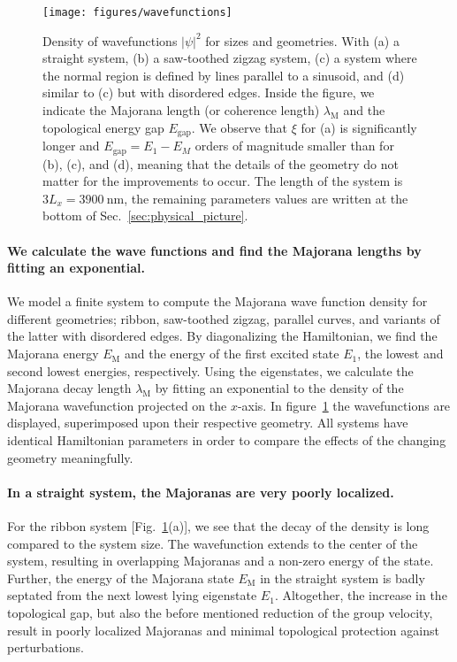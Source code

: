 \documentclass[english, twocolumn, 10pt, aps, superscriptaddress, floatfix, prb, citeautoscript]{revtex4-1}
\renewcommand{\comment}[2]{#2}
\renewcommand{\comment}{\paragraph}
\begin{document}
\begin{figure}[!htb]
\texttt{[image: figures/wavefunctions]}
\caption{Density of wavefunctions $\left|\psi\right|^2$ for sizes and geometries.
With (a) a straight system, (b) a saw-toothed zigzag system, (c) a system where the normal region is defined by lines parallel to a sinusoid, and (d) similar to (c) but with disordered edges.
Inside the figure, we indicate the Majorana length (or coherence length) $\lambda_\textrm{M}$ and the topological energy gap $E_\textrm{gap}$.
We observe that $\xi$ for (a) is significantly longer and $E_\textrm{gap} = E_\textrm{1} - E_M$ orders of magnitude smaller than for (b), (c), and (d), meaning that the details of the geometry do not matter for the improvements to occur.
The length of the system is $3L_x=\SI{3900}{\nm}$, the remaining parameters values are written at the bottom of Sec.~\ref{sec:physical_picture}.\label{fig:wavefunctions}}
\end{figure}

\comment{We calculate the wave functions and find the Majorana lengths by fitting an exponential.}
We model a finite system to compute the Majorana wave function density for different geometries; ribbon, saw-toothed zigzag, parallel curves, and variants of the latter with disordered edges.
By diagonalizing the Hamiltonian, we find the Majorana energy $E_\textrm{M}$ and the energy of the first excited state $E_1$, the lowest and second lowest energies, respectively.
Using the eigenstates, we calculate the Majorana decay length $\lambda_\textrm{M}$ by fitting an exponential to the density of the Majorana wavefunction projected on the $x$-axis.
In figure~\ref{fig:wavefunctions} the wavefunctions are displayed, superimposed upon their respective geometry.
All systems have identical Hamiltonian parameters in order to compare the effects of the changing geometry meaningfully.

\comment{In a straight system, the Majoranas are very poorly localized.}
For the ribbon system [Fig.~\ref{fig:wavefunctions}(a)], we see that the decay of the density is long compared to the system size.
The wavefunction extends to the center of the system, resulting in overlapping Majoranas and a non-zero energy of the state.
Further, the energy of the Majorana state $E_\textrm{M}$ in the straight system is badly septated from the next lowest lying eigenstate $E_1$.
Altogether, the increase in the topological gap, but also the before mentioned reduction of the group velocity, result in poorly localized Majoranas and minimal topological protection against perturbations.  %
\end{document}
